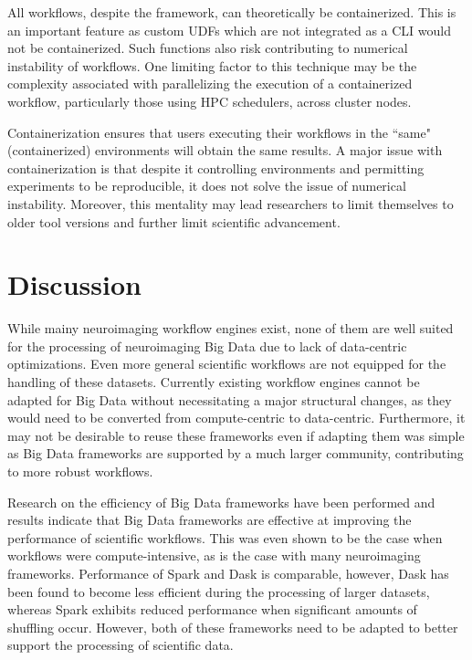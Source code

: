            All workflows, despite the framework, can theoretically be
            containerized. This is an important feature as custom UDFs which are
            not integrated as a CLI would not be containerized. Such functions
            also risk contributing to numerical instability of workflows. One
            limiting factor to this technique may be the complexity associated
            with parallelizing the execution of a containerized workflow,
            particularly those using HPC schedulers, across cluster nodes.  

            Containerization ensures that users executing their workflows in the
            ``same" (containerized) environments will obtain the same results. A
            major issue with containerization is that despite it controlling
            environments and permitting experiments to be reproducible, it does
            not solve the issue of numerical instability. Moreover, this
            mentality may lead researchers to limit themselves to older tool
            versions and further limit scientific advancement.
    
    
    \section{Discussion}
    
        While mainy neuroimaging workflow engines exist, none of them are well
        suited for the processing of neuroimaging Big Data due to lack of
        data-centric optimizations. Even more general scientific workflows are
        not equipped for the handling of these datasets. Currently existing
        workflow engines cannot be adapted for Big Data without necessitating a
        major structural changes, as they would need to be converted from
        compute-centric to data-centric. Furthermore, it may not be desirable to
        reuse these frameworks even if adapting them was simple as Big Data
        frameworks are supported by a much larger community, contributing to
        more robust workflows.

        Research on the efficiency of Big Data frameworks have been performed
        and results indicate that Big Data frameworks are effective at improving
        the performance of scientific workflows. This was even shown to be the
        case when workflows were compute-intensive, as is the case with many
        neuroimaging frameworks. Performance of Spark and Dask is comparable,
        however, Dask has been found to become less efficient during the
        processing of larger datasets, whereas Spark exhibits reduced
        performance when significant amounts of shuffling occur. However, both
        of these frameworks need to be adapted to better support the processing
        of scientific data. 

